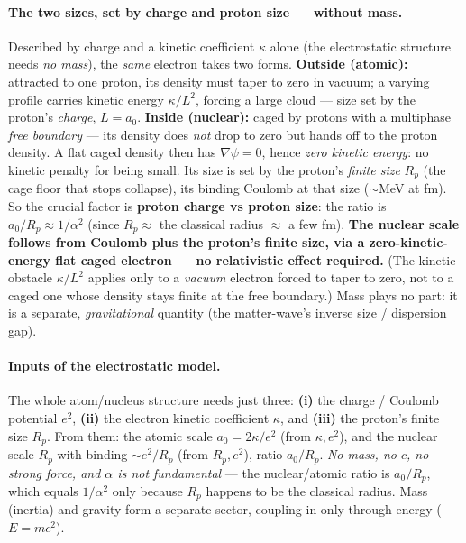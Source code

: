 \documentclass[11pt]{article}
\begin{document}
\paragraph{The two sizes, set by charge and proton size --- without mass.} Described by charge and a
kinetic coefficient $\kappa$ alone (the electrostatic structure needs \emph{no mass}), the \emph{same}
electron takes two forms. \textbf{Outside (atomic):} attracted to one proton, its density must taper to
zero in vacuum; a varying profile carries kinetic energy $\kappa/L^2$, forcing a large cloud --- size set
by the proton's \emph{charge}, $L=a_0$. \textbf{Inside (nuclear):} caged by protons with a multiphase
\emph{free boundary} --- its density does \emph{not} drop to zero but hands off to the proton density. A
flat caged density then has $\nabla\psi=0$, hence \emph{zero kinetic energy}: no kinetic penalty for being
small. Its size is set by the proton's \emph{finite size} $R_p$ (the cage floor that stops collapse), its
binding Coulomb at that size ($\sim$MeV at fm). So the crucial factor is \textbf{proton charge vs proton
size}: the ratio is $a_0/R_p\approx1/\alpha^2$ (since $R_p\approx$ the classical radius $\approx$ a few fm).
\textbf{The nuclear scale follows from Coulomb plus the proton's finite size, via a zero-kinetic-energy
flat caged electron --- no relativistic effect required.} (The kinetic obstacle $\kappa/L^2$ applies only
to a \emph{vacuum} electron forced to taper to zero, not to a caged one whose density stays finite at the
free boundary.) Mass plays no part: it is a separate, \emph{gravitational} quantity (the matter-wave's
inverse size / dispersion gap).

\paragraph{Inputs of the electrostatic model.} The whole atom/nucleus structure needs just three:
\textbf{(i)} the charge / Coulomb potential $e^2$, \textbf{(ii)} the electron kinetic coefficient $\kappa$,
and \textbf{(iii)} the proton's finite size $R_p$. From them: the atomic scale $a_0=2\kappa/e^2$ (from
$\kappa,e^2$), and the nuclear scale $R_p$ with binding ${\sim}e^2/R_p$ (from $R_p,e^2$), ratio $a_0/R_p$.
\emph{No mass, no $c$, no strong force, and $\alpha$ is not fundamental} --- the nuclear/atomic ratio is
$a_0/R_p$, which equals $1/\alpha^2$ only because $R_p$ happens to be the classical radius. Mass (inertia)
and gravity form a separate sector, coupling in only through energy ($E=mc^2$).
\end{document}

